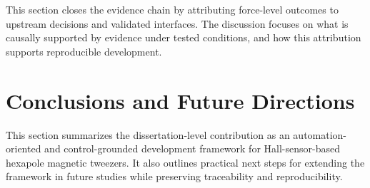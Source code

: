 This section closes the evidence chain by attributing force-level outcomes to upstream decisions and validated interfaces. The discussion focuses on what is causally supported by evidence under tested conditions, and how this attribution supports reproducible development.

\section{Conclusions and Future Directions}

This section summarizes the dissertation-level contribution as an automation-oriented and control-grounded development framework for Hall-sensor-based hexapole magnetic tweezers. It also outlines practical next steps for extending the framework in future studies while preserving traceability and reproducibility.
